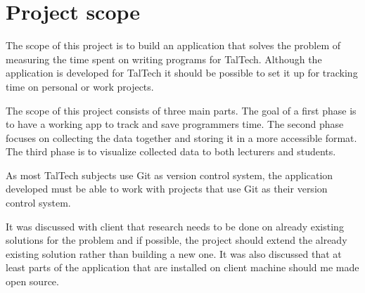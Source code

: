 \section{Project scope}\label{sec:project-scope}
The scope of this project is to build an application that solves the problem of measuring the time spent on writing programs for TalTech.
Although the application is developed for TalTech it should be possible to set it up for tracking time on personal or work projects.

The scope of this project consists of three main parts.
The goal of a first phase is to have a working app to track and save programmers time.
The second phase focuses on collecting the data together and storing it in a more accessible format.
The third phase is to visualize collected data to both lecturers and students.

As most TalTech subjects use Git as version control system, the application developed must be able to work with
projects that use Git as their version control system.

It was discussed with client that research needs to be done on already existing solutions for the problem and if possible,
the project should extend the already existing solution rather than building a new one.
It was also discussed that at least parts of the application that are installed on client machine should me made open source.

